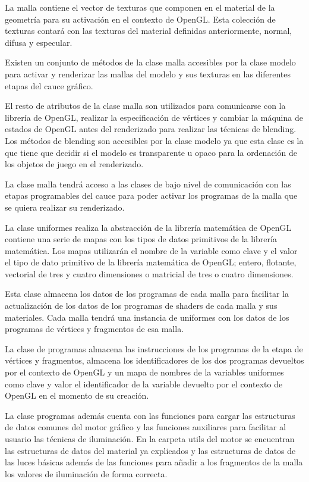 \documentclass[a4paper, 17pt]{book}
\begin{document}
La malla contiene el vector de texturas que componen en el material de la geometría para su activación en el contexto de OpenGL.
Esta colección de texturas contará con las texturas del material definidas anteriormente, normal, difusa y especular.

Existen un conjunto de métodos de la clase malla accesibles por la clase modelo para activar y renderizar las mallas del modelo
y sus texturas en las diferentes etapas del cauce gráfico.

El resto de atributos de la clase malla son utilizados para comunicarse con la librería de OpenGL, realizar la especificación de
vértices y cambiar la máquina de estados de OpenGL antes del renderizado para realizar las técnicas de blending. Los métodos de
blending son accesibles por la clase modelo ya que esta clase es la que tiene que decidir si el modelo es transparente u opaco
para la ordenación de los objetos de juego en el renderizado. 

La clase malla tendrá acceso a las clases de bajo nivel de comunicación con las etapas programables del cauce para poder activar
los programas de la malla que se quiera realizar su renderizado.

La clase uniformes realiza la abstracción de la librería matemática de OpenGL contiene una serie de mapas con los tipos de datos
primitivos de la librería matemática. Los mapas utilizarán el nombre de la variable como clave y el valor el tipo de dato primitivo
de la librería matemática de OpenGL; entero, flotante, vectorial de tres y cuatro dimensiones o matricial de tres o cuatro dimensiones. 

Esta clase almacena los datos de los programas de cada malla para facilitar la actualización de los datos de los programas de
shaders de cada malla y sus materiales. Cada malla tendrá una instancia de uniformes con los datos de los programas de vértices
y fragmentos de esa malla.

La clase de programas almacena las instrucciones de los programas de la etapa de vértices y fragmentos, almacena los identificadores
de los dos programas devueltos por el contexto de OpenGL y un mapa de nombres de la variables uniformes como clave y valor el
identificador de la variable devuelto por el contexto de OpenGL en el momento de su creación.

La clase programas además cuenta con las funciones para cargar las estructuras de datos comunes del motor gráfico y las funciones
auxiliares para facilitar al usuario las técnicas de iluminación. En la carpeta utils del motor se encuentran las estructuras de
datos del material ya explicados y las estructuras de datos de las luces básicas además de las funciones para añadir a los fragmentos
de la malla los valores de iluminación de forma correcta.
\end{document}
